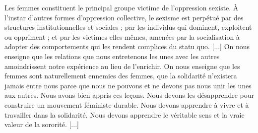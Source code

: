 \begin{center}
  \large {}
\end{center}

Les femmes constituent le principal groupe victime de l'oppression sexiste. À l'instar d'autres formes d'oppression collective, le sexisme est perpétué par des structures institutionnelles et sociales ; par les individus qui dominent, exploitent ou oppriment ; et par les victimes elles-mêmes, amenées par la socialisation à adopter des comportements qui les rendent complices du statu quo.
[...]
On nous enseigne que les relations que nous entretenons les unes avec les autres amoindrissent notre expérience au lieu de l'enrichir.
On nous enseigne que les femmes sont \og naturellement \fg\; ennemies des femmes, que la solidarité n'existera jamais entre nous parce que nous ne pouvons et ne devons pas nous unir les unes aux autres.
Nous avons bien appris ces leçons.
Nous devons les désapprendre pour construire un mouvement féministe durable.
Nous devons apprendre à vivre et à travailler dans la solidarité.
Nous devons apprendre le véritable sens et la vraie valeur de la sororité.
[...] \bigskip



